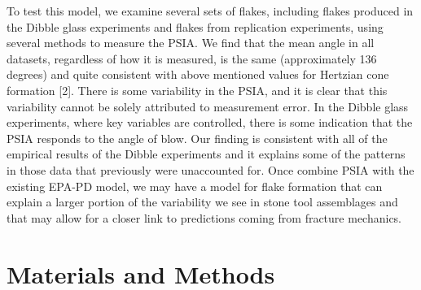 \documentclass[10pt,letterpaper]{article}
\begin{document}
To test this model, we examine several sets of flakes, including flakes
produced in the Dibble glass experiments and flakes from replication
experiments, using several methods to measure the PSIA. We find that the
mean angle in all datasets, regardless of how it is measured, is the
same (approximately 136 degrees) and quite consistent with above
mentioned values for Hertzian cone formation {[}2{]}. There is some
variability in the PSIA, and it is clear that this variability cannot be
solely attributed to measurement error. In the Dibble glass experiments,
where key variables are controlled, there is some indication that the
PSIA responds to the angle of blow. Our finding is consistent with all
of the empirical results of the Dibble experiments and it explains some
of the patterns in those data that previously were unaccounted for. Once
combine PSIA with the existing EPA-PD model, we may have a model for
flake formation that can explain a larger portion of the variability we
see in stone tool assemblages and that may allow for a closer link to
predictions coming from fracture mechanics.

\hypertarget{materials-and-methods}{%
\section{Materials and Methods}\label{materials-and-methods}}
\end{document}
